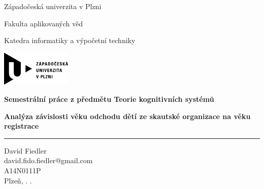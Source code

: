 \documentclass[a4paper,12pt]{article}
\begin{document}
\begin{titlepage}

\sffamily	%

	\begin{center}
		\begin{Large}
		
		Západočeská univerzita v Plzni

		\vspace*{0.2cm}
		
		Fakulta aplikovaných věd

		\vspace*{0.2cm}
		
		Katedra informatiky a výpočetní techniky
		
		\vspace*{5mm}

		\includegraphics[width=0.25\textwidth]{obrazky/logo_zcu}	
		
		\vspace*{2cm}
		
		{\Huge\bfseries Semestrální práce z předmětu Teorie kognitivních systémů}

		\vspace*{1cm}
		
		{\bfseries Analýza závislosti věku odchodu dětí ze skautské organizace na věku registrace}
		\end{Large}
	\end{center}
	
	\vfill

	\hrule
	
	\noindent
	David Fiedler \\ 
	david.fido.fiedler@gmail.com \\
	A14N0111P \\
	Plzeň, \number\day. \number\month. \number\year

\rmfamily	%

\end{titlepage}
\end{document}
